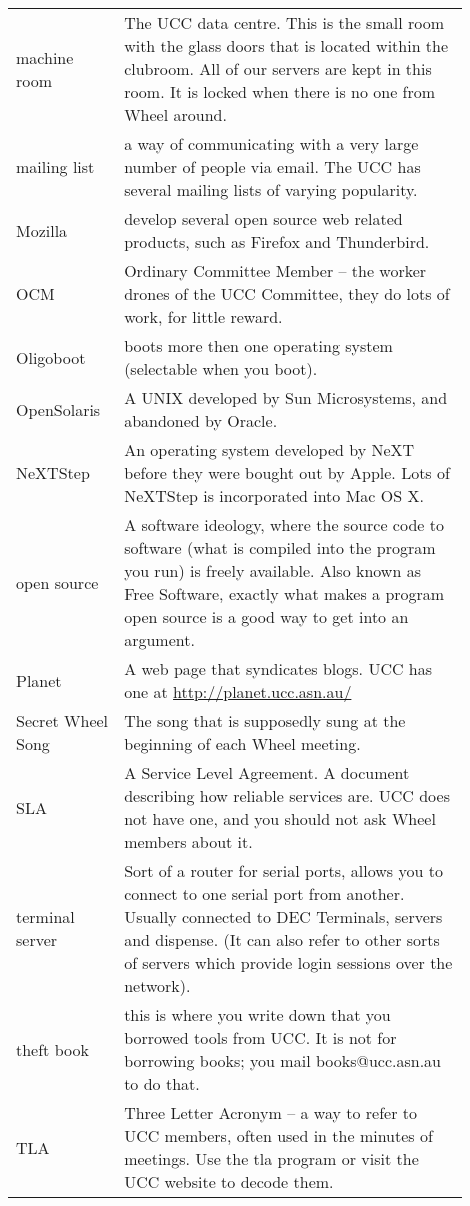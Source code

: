 {\begin{tabular}{p{0.2\linewidth}|p{0.7\linewidth}}
machine room &
The UCC data centre. This is the small room with the glass doors that is located within the clubroom. All of our servers are kept in this room. It is locked when there is no one from Wheel around. \\
mailing list &
a way of communicating with a very large number of people via email. The UCC has several mailing lists of varying popularity. \\
Mozilla &
develop several open source web related products, such as Firefox and Thunderbird. \\
OCM &
Ordinary Committee Member -- the worker drones of the UCC Committee, they do lots of work, for little reward. \\
Oligoboot &
boots more then one operating system (selectable when you boot). \\
OpenSolaris &
A UNIX developed by Sun Microsystems, and abandoned by Oracle. \\
NeXTStep &
An operating system developed by NeXT before they were bought out by Apple. Lots of NeXTStep is incorporated into Mac OS X. \\
open source &
A software ideology, where the source code to software (what is compiled into the program you run) is freely available. Also known as Free Software, exactly what makes a program open source is a good way to get into an argument. \\
Planet &
A web page that syndicates blogs. UCC has one at \url{http://planet.ucc.asn.au/} \\
Secret Wheel Song &
The song that is supposedly sung at the beginning of each Wheel meeting. \\ %
SLA &
A Service Level Agreement. A document describing how reliable services are. UCC does not have one, and you should not ask Wheel members about it. \\
terminal server &
Sort of a router for serial ports, allows you to connect to one serial port from another. Usually connected to DEC Terminals, servers and dispense. (It can also refer to other sorts of servers which provide login sessions over the network). \\
theft book &
this is where you write down that you borrowed tools from UCC. It is not for borrowing books; you mail books@ucc.asn.au to do that. \\
TLA &
Three Letter Acronym -- a way to refer to UCC members, often used in the minutes of meetings. Use the tla program or visit the UCC website to decode them. \\

\end{tabular}}
